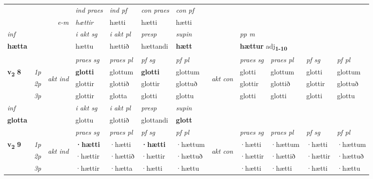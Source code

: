 \begin{longtable}[l]{X>{\footnotesize\itshape}llXXXXlXXXX}
   && &  \textit{ind praes} & \textit{ind pf} & \textit{con praes} & \textit{con pf} \\*
\multicolumn{3}{r}{\textit{e-m}} & hættir & hætti & hætti & hætti \\*

\cmidrule{4-7}
   {\textit{inf}} & &  & \textit{i akt sg} & \textit{i akt pl}   & \textit{presp} & \textit{supin}  && \textit{pp m} \\*
  {\textbf{hætta}} & && hættu  & hættið   & hættandi &  \textbf{hætt}  && \multicolumn{2}{l}{\textbf{hættur} adj\textbf{\textsubscript{1-10}}} \\*

\midrule

 & &   & \textit{praes sg}  & \textit{praes pl}    & \textit{ pf sg} & \textit{pf pl} & & \textit{praes sg}  & \textit{praes pl}    & \textit{pf sg} & \textit{pf pl }  \\ \cmidrule{4-7} \cmidrule{9-12}
 \multirow{2}{*}{{{\textbf{v{\textsubscript{2}}} \Large{\textbf{8}}}}}  & 1p & \multirow{3}{*}{\begin{turn}{90}\textit{akt ind}\end{turn}} & \textbf{glotti} & glottum & \textbf{glotti} & glottum & \multirow{3}{*}{\begin{turn}{90}\textit{akt con}\end{turn}} &glotti & glottum & glotti & glottum\\*
 & 2p &  &  glottir  & glottið & glottir & glottuð & & glottir & glottið & glottir & glottuð \\*
 & 3p &  & glottir & glotta & glotti & glottu & & glotti & glotti& glotti & glottu \\*
\cmidrule{4-7} \cmidrule{9-12}

   {\textit{inf}} & &  & \textit{i akt sg} & \textit{i akt pl}   & \textit{presp} & \textit{supin}   \\*
  {\textbf{glotta}} & && glottu  & glottið   & glottandi &  \textbf{glott}   \\*

\midrule
 
   \midrule
 & &   & \textit{praes sg}  & \textit{praes pl}    & \textit{ pf sg} & \textit{pf pl} & & \textit{praes sg}  & \textit{praes pl}    & \textit{pf sg} & \textit{pf pl }  \\ \cmidrule{4-7} \cmidrule{9-12}
 \multirow{2}{*}{{{\textbf{v{\textsubscript{2}}} \Large{\textbf{9}}}}}  & 1p & \multirow{3}{*}{\begin{turn}{90}\textit{akt ind}\end{turn}} & \textbf{·hætti} & ·hætti & \textbf{·hætti} & ·hættum & \multirow{3}{*}{\begin{turn}{90}\textit{akt con}\end{turn}} &·hætti & ·hættum & ·hætti & ·hættum\\*
 & 2p &  &  ·hættir  & ·hættið & ·hættir & ·hættuð & & ·hættir & ·hættið & ·hættir & ·hættuð \\*
 & 3p &  & ·hættir & ·hætta & ·hætti & ·hættu & & ·hætti & ·hætti& ·hætti & ·hættu \\*
\cmidrule{4-7} \cmidrule{9-12}


\end{longtable}
